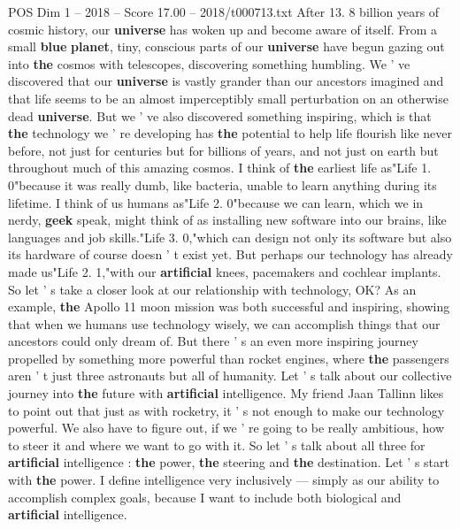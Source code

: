 \begin{textsample}{POS Dim 1 – 2018 – Score 17.00 – 2018/t000713.txt}  \label{ex:f1_pos_067}
After 13. 8 billion years of cosmic history, our \textbf{universe} has woken up and become aware of itself.
From a small \textbf{blue} \textbf{planet}, tiny, conscious parts of our \textbf{universe} have begun gazing out into \textbf{the} cosmos with telescopes, discovering something humbling.
We ' ve discovered that our \textbf{universe} is vastly grander than our ancestors imagined and that life seems to be an almost imperceptibly small perturbation on an otherwise dead \textbf{universe}.
But we ' ve also discovered something inspiring, which is that \textbf{the} technology we ' re developing has \textbf{the} potential to help life flourish like never before, not just for centuries but for billions of years, and not just on earth but throughout much of this amazing cosmos.
I think of \textbf{the} earliest life as"Life 1. 0"because it was really dumb, like bacteria, unable to learn anything during its lifetime.
I think of us humans as"Life 2. 0"because we can learn, which we in nerdy, \textbf{geek} speak, might think of as installing new software into our brains, like languages and job skills."Life 3. 0,"which can design not only its software but also its hardware of course doesn ' t exist yet.
But perhaps our technology has already made us"Life 2. 1,"with our \textbf{artificial} knees, pacemakers and cochlear implants.
So let ' s take a closer look at our relationship with technology, OK?
As an example, \textbf{the} Apollo 11 moon mission was both successful and inspiring, showing that when we humans use technology wisely, we can accomplish things that our ancestors could only dream of.
But there ' s an even more inspiring journey propelled by something more powerful than rocket engines, where \textbf{the} passengers aren ' t just three astronauts but all of humanity.
Let ' s talk about our collective journey into \textbf{the} future with \textbf{artificial} intelligence.
My friend Jaan Tallinn likes to point out that just as with rocketry, it ' s not enough to make our technology powerful.
We also have to figure out, if we ' re going to be really ambitious, how to steer it and where we want to go with it.
So let ' s talk about all three for \textbf{artificial} intelligence : \textbf{the} power, \textbf{the} steering and \textbf{the} destination.
Let ' s start with \textbf{the} power.
I define intelligence very inclusively — simply as our ability to accomplish complex goals, because I want to include both biological and \textbf{artificial} intelligence.

\end{textsample}
